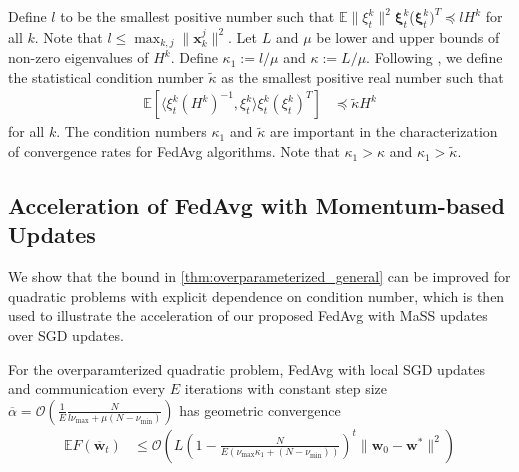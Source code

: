 {} Define $l$ to be the smallest positive number such that $\mathbb{E}\|\xi_{t}^{k}\|^{2}$$\mathbf{\xi}_{t}^{k}$($\mathbf{\xi}_{t}^{k})^{T}\preceq lH^{k}$
for all $k$. Note that $l\leq\max_{k,j}\|\mathbf{x}_{k}^{j}\|^{2}$.
Let $L$ and $\mu$ be lower and upper bounds of non-zero eigenvalues
of $H^{k}$. Define $\kappa_{1}:=l/\mu$ and $\kappa:=L/\mu$. Following
\cite{liu2018accelerating,jain2017accelerating}, we define the statistical
condition number $\tilde{\kappa}$ as the smallest positive real number
such that 
\begin{align*}
\mathbb{E}\left[\langle\xi_{t}^{k}(H^{k})^{-1},\xi_{t}^{k}\rangle\xi_{t}^{k}(\xi_{t}^{k})^{T}\right] & \preceq\tilde{\kappa}H^{k}
\end{align*}
for all $k$. The condition numbers $\kappa_{1}$ and $\tilde{\kappa}$
are important in the characterization of convergence rates for FedAvg
algorithms. Note that $\kappa_{1}>\kappa$ and $\kappa_{1}>\tilde{\kappa}$. 

\subsection{Acceleration of FedAvg with Momentum-based Updates}

We show that the bound in \ref{thm:overparameterized_general} can
be improved for quadratic problems with explicit dependence on condition
number, which is then used to illustrate the acceleration of our proposed
FedAvg with MaSS updates over SGD updates.
\begin{theorem}
	\label{thm:overparameterized_quadratic}For the overparamterized quadratic
	problem, FedAvg with local SGD updates and communication every $E$
	iterations with constant step size $\overline{\alpha}=\mathcal{O}(\frac{1}{E}\frac{N}{l\nu_{\max}+\mu(N-\nu_{\min})})$
	has geometric convergence 
	\begin{align*}
	\mathbb{E}F(\overline{\mathbf{w}}_{t}) & \leq\mathcal{O}\left(L(1-\frac{N}{E(\nu_{\max}\kappa_{1}+(N-\nu_{\min}))})^{t}\|\mathbf{w}_{0}-\mathbf{w}^{\ast}\|^{2}\right)
	\end{align*}
\end{theorem}

